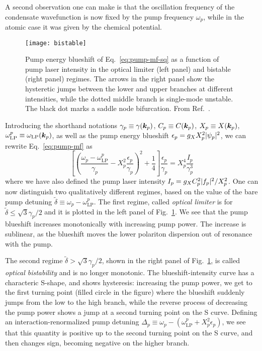 A second observation one can make is that the oscillation frequency of
the condensate wavefunction is now fixed by the pump frequency
$\omega_p$, while in the atomic case it was given by the chemical
potential.
%
\begin{figure}[tb]\centering
  \texttt{[image: bistable]}
  \caption{
    Pump energy blueshift of Eq.~\eqref{eq:pump-mf-sq} as a function of pump laser intensity in the optical limiter (left panel) and bistable (right panel) regimes. The arrows in the right panel show the hysteretic jumps between the lower and upper branches at different intensities, while the dotted middle branch is single-mode unstable. The black dot marks a saddle node bifurcation. From Ref.~\cite{Wouters_2007_b}.
  }\label{fig:bistable}
\end{figure}
% 
Introducing the shorthand notations $\gamma_p \equiv \gamma(\bm{k}_p)$,
$C_p \equiv C(\bm{k}_p)$, $X_p \equiv X(\bm{k}_p)$,
$\omega^p_{\text{LP}} \equiv \omega_{\text{LP}}(\bm{k}_p)$, as well as
the pump energy blueshift $\epsilon_p = g_X X_p^2 \vert \psi_p \vert^2$, we
can rewrite Eq.~\eqref{eq:pump-mf} as
%
\begin{equation}\label{eq:pump-mf-sq}
  \left[\left(\frac{\omega_p-\omega^p_{\text{LP}}}{\gamma_p} - X_p^2 \frac{\epsilon_p}{\gamma_p}\right)^2 + \frac{1}{4} \right] \frac{\epsilon_p}{\gamma_p} = X_p^4 \frac{I_p}{\gamma_p^3}
\end{equation}
%
where we have also defined the pump laser intensity
$I_p = g_X C_p^2 \vert f_p \vert^2/X_p^2$. One can now distinguish two
qualitatively different regimes, based on the value of the bare pump
detuning $\tilde{\delta} \equiv \omega_p-\omega^p_{\text{LP}}$. The
first regime, called \textit{optical limiter} is for
$\tilde{\delta} \leq \sqrt{3}\gamma_p/2$ and it is plotted in the left
panel of Fig.~\ref{fig:bistable}. We see that the pump blueshift
increases monotonically with increasing pump power. The increase is
sublinear, as the blueshift moves the lower polariton dispersion out
of resonance with the pump.

The second regime $\tilde{\delta} > \sqrt{3}\gamma_p/2$, shown in the
right panel of Fig.~\ref{fig:bistable}, is called \textit{optical
  bistability} and is no longer monotonic. The blueshift-intensity
curve has a characteric S-shape, and shows hysteresis: increasing the
pump power, we get to the first turning point (filled circle in the
figure) where the blueshift suddenly jumps from the low to the high
branch, while the reverse process of decreasing the pump power shows a
jump at a second turning point on the S curve. Defining an
interaction-renormalized pump detuning
$\Delta_p \equiv \omega_p-(\omega^p_{\text{LP}} + X_p^2\epsilon_p)$,
we see that this quantity is positive up to the second turning point
on the S curve, and then changes sign, becoming negative on the higher
branch.

